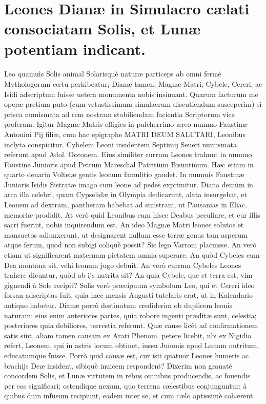 \documentclass[a4paper, 11pt, oneside, polutonikogreek, latin]{article}
\begin{document}
\section{Leones Dianæ in Simulacro cælati consociatam Solis, et Lunæ potentiam indicant.}
\paragraph{}
Leo quamuìs Solis animal Solarisquè naturæ particeps ab omni fermè Mythologorum cœtu perhibeatur; Dianæ tamen, Magnæ Matri, Cybele, Cereri, ac Isidi adscriptum fuisse uetera monumenta nobis insinuant. Quarum facturum me operæ pretium puto (cum vetustissimum simulacrum discutiendum susceperim) si prisca numismata ad rem nostram stabiliendam facientia Scriptorum vice proferam. Igitur Magnæ Matris effigies in pulcherrimo æreo nummo Faustinæ Antonini Pij filiæ, cum hac epigraphe MATRI DEUM SALUTARI, Leonibus inclyta conspicitur. Cybelem Leoni insidentem Septimij Seueri numismata referunt apud Adol. Occonem. Eius similiter currum Leones trahunt in nummo Faustine Junioris apud Petrum Mareschal Patritium Bisuntinum. Hæc etiam in quarto denario Volteiæ gentis leonum famulitio gaudet. In nummis Faustinæ Junioris Isidis Sistratæ imago cum leone ad pedes exprimitur. Diana demùm in arca illa celebri, quam Cypselidæ in Olympia dedicarunt, alata insurgebat, et Leonem ad dextram, pantheram habebat ad sinistram, ut Pausanias in Eliac. memoriæ prodidit. At verò quid Leonibus cum hisce Deabus peculiare, et cur illis sacri fuerint, nobis inquirendum est. An ideo Magnæ Matri leones solutos et mansuetos adiunxerunt, ut designarent nullum esse terræ genus tam asperum atque ferum, quod non subigi coliquè possit? Sic lego Varroni placuisse. An verò etiam ut significarent maternam pietatem omnia superare. An quòd Cybeles cum Dea montana sit, vehi leonum jugo debuit. An verò currum Cybeles Leones trahere dicuntur, quòd ab ijs nutrita sit? An quia Cybele, que et terra est, vim gignendi à Sole recipit? Solis verò præcipuum symbolum Leo, qui et Cereri ideo forsan adscriptus fuit, quia hæc mensis Augusti tutelaris erat, ut in Kalendario antiquo habetur. Dianæ porrò destinatum crediderim ob duplicem leonis naturam: eius enim anteriores partes, quia robore ingenti præditæ sunt, celestia; posteriores quia debiliores, terrestia referunt. Quæ cause licèt ad confirmationem satis sint, aliam tamen causam ex Arati Phenom. petere licebit, ubi ex Nigidio refert, Leonem, qui in astris locum obtinet, iussu Junonis apud Lunam nutritum, educatumque fuisse. Porrò quid causæ est, cur isti quatuor Leones humeris ac brachijs Deæ insident, sibiquè inuicem respondent? Dixerim non grauatè concordem Solis, et Lunæ virtutem in rebus omnibus producendis, ac fouendis per eos significari; ostendique nexum, quo terrena cælestibus conjunguntur; à quibus dum infusum recipiunt, eadem inter se, et cum cælo aptissimè cohærent.
\clearpage
\end{document}
